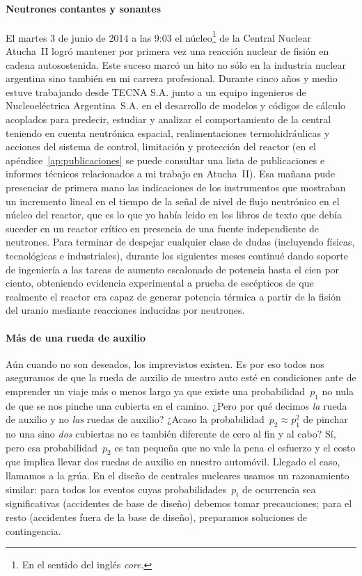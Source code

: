\paragraph{Neutrones contantes y sonantes}
El martes 3 de junio de 2014 a las 9:03 el núcleo\footnote{En el sentido del inglés \emph{core}.} de la Central Nuclear Atucha~II logró mantener por primera vez una reacción nuclear de fisión en cadena autosostenida. Este suceso marcó un hito no sólo en la industria nuclear argentina sino también en mi carrera profesional. Durante cinco años y medio estuve trabajando desde TECNA S.A. junto a un equipo ingenieros de Nucleoeléctrica Argentina~S.A. en el desarrollo de modelos y códigos de cálculo acoplados para predecir, estudiar y analizar el comportamiento de la central teniendo en cuenta neutrónica espacial, realimentaciones termohidráulicas y acciones del sistema de control, limitación y protección del reactor (en el apéndice~\ref{ap:publicaciones} se puede consultar una lista de publicaciones e informes técnicos relacionados a mi trabajo en Atucha~II). Esa mañana pude presenciar de primera mano las indicaciones de los instrumentos que mostraban un incremento lineal en el tiempo de la señal de nivel de flujo neutrónico en el núcleo del reactor, que es lo que yo había leido en los libros de texto que debía suceder en un reactor crítico en presencia de una fuente independiente de neutrones. Para terminar de despejar cualquier clase de dudas (incluyendo físicas, tecnológicas e industriales), durante los siguientes meses continué dando soporte de ingeniería a las tareas de aumento escalonado de potencia hasta el cien por ciento, obteniendo evidencia experimental a prueba de escépticos de que realmente el reactor era capaz de generar potencia térmica a partir de la fisión del uranio mediante reacciones inducidas por neutrones.

\paragraph{Más de una rueda de auxilio}
Aún cuando no son deseados, los imprevistos existen. Es por eso todos nos aseguramos de que la rueda de auxilio de nuestro auto esté en condiciones ante de emprender un viaje más o menos largo ya que existe una probabilidad~$p_1$ no nula de que se nos pinche una cubierta en el camino.  ¿Pero por qué decimos \emph{la} rueda de auxilio y no \emph{las} ruedas de auxilio? ¿Acaso la probabilidad~$p_2 \approx p_1^2$ de pinchar no una sino \emph{dos} cubiertas no es también diferente de cero al fin y al cabo? Sí, pero esa probabilidad~$p_2$ es tan pequeña que no vale la pena el esfuerzo y el costo que implica llevar dos ruedas de auxilio en nuestro automóvil. Llegado el caso, llamamos a la grúa. En el diseño de centrales nucleares usamos un razonamiento similar: para todos los eventos cuyas probabilidades~$p_i$ de ocurrencia sea significativas (accidentes de base de diseño) debemos tomar precauciones; para el resto (accidentes fuera de la base de diseño), preparamos soluciones de contingencia.

